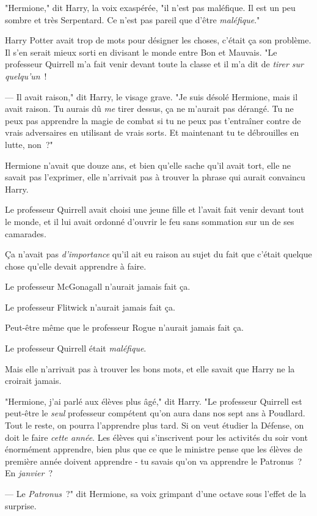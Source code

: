 "Hermione," dit Harry, la voix exaspérée, "il n'est pas maléfique. Il est un peu sombre et très Serpentard. Ce n'est pas pareil que d'être \emph{maléfique}."

Harry Potter avait trop de mots pour désigner les choses, c'était ça son problème. Il s'en serait mieux sorti en divisant le monde entre Bon et Mauvais. "Le professeur Quirrell m'a fait venir devant toute la classe et il m'a dit de \emph{tirer sur quelqu'un}~!

--- Il avait raison," dit Harry, le visage grave. "Je suis désolé Hermione, mais il avait raison. Tu aurais dû \emph{me} tirer dessus, ça ne m'aurait pas dérangé. Tu ne peux pas apprendre la magie de combat si tu ne peux pas t'entraîner contre de vrais adversaires en utilisant de vrais sorts. Et maintenant tu te débrouilles en lutte, non~?"

Hermione n'avait que douze ans, et bien qu'elle sache qu'il avait tort, elle ne savait pas l'exprimer, elle n'arrivait pas à trouver la phrase qui aurait convaincu Harry.

Le professeur Quirrell avait choisi une jeune fille et l'avait fait venir devant tout le monde, et il lui avait ordonné d'ouvrir le feu sans sommation sur un de ses camarades.

Ça n'avait pas \emph{d'importance} qu'il ait eu raison au sujet du fait que c'était quelque chose qu'elle devait apprendre à faire.

Le professeur McGonagall n'aurait jamais fait ça.

Le professeur Flitwick n'aurait jamais fait ça.

Peut-être même que le professeur Rogue n'aurait jamais fait ça.

Le professeur Quirrell était \emph{maléfique}.

Mais elle n'arrivait pas à trouver les bons mots, et elle savait que Harry ne la croirait jamais.

"Hermione, j'ai parlé aux élèves plus âgé," dit Harry. "Le professeur Quirrell est peut-être le \emph{seul} professeur compétent qu'on aura dans nos sept ans à Poudlard. Tout le reste, on pourra l'apprendre plus tard. Si on veut étudier la Défense, on doit le faire \emph{cette année}. Les élèves qui s'inscrivent pour les activités du soir vont énormément apprendre, bien plus que ce que le ministre pense que les élèves de première année doivent apprendre - tu savais qu'on va apprendre le Patronus~? En \emph{janvier}~?

--- Le \emph{Patronus}~?" dit Hermione, sa voix grimpant d'une octave sous l'effet de la surprise.

